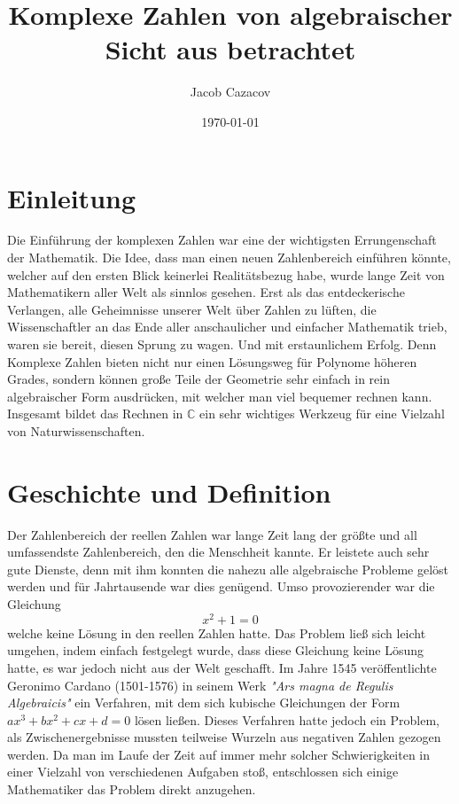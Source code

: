 \documentclass[a4paper,12pt]{article} %
\author{Jacob Cazacov}
\title{Komplexe Zahlen von algebraischer Sicht aus betrachtet}
\date{\today}
\begin{document}

\maketitle

\newpage

\tableofcontents

\newpage

\section{Einleitung}

Die Einführung der komplexen Zahlen war eine der wichtigsten Errungenschaft der Mathematik.
Die Idee, dass man einen neuen Zahlenbereich einführen könnte, welcher auf den ersten Blick keinerlei Realitätsbezug habe, wurde lange Zeit von Mathematikern aller Welt als sinnlos gesehen.
Erst als das entdeckerische Verlangen, alle Geheimnisse unserer Welt über Zahlen zu lüften, die Wissenschaftler an das Ende aller anschaulicher und einfacher Mathematik trieb, waren sie bereit, diesen Sprung zu wagen.
Und mit erstaunlichem Erfolg. Denn Komplexe Zahlen bieten nicht nur einen Lösungsweg für Polynome höheren Grades, sondern können große Teile der Geometrie sehr einfach in rein algebraischer Form ausdrücken, mit welcher man viel bequemer rechnen kann.
Insgesamt bildet das Rechnen in $\mathbb{C}$ ein sehr wichtiges Werkzeug für eine Vielzahl von Naturwissenschaften.

\section{Geschichte und Definition}

Der Zahlenbereich der reellen Zahlen war lange Zeit lang der größte und all umfassendste Zahlenbereich, den die Menschheit kannte.
Er leistete auch sehr gute Dienste, denn mit ihm konnten die nahezu alle algebraische Probleme gelöst werden und für Jahrtausende war dies genügend.
Umso provozierender war die Gleichung 
\[x^2+1=0\]
welche keine Lösung in den reellen Zahlen hatte.
Das Problem ließ sich leicht umgehen, indem einfach festgelegt wurde, dass diese Gleichung keine Lösung hatte, es war jedoch nicht aus der Welt geschafft.
Im Jahre 1545 veröffentlichte Geronimo Cardano (1501-1576) in seinem Werk \emph{"{Ars} magna de Regulis Algebraicis"} ein Verfahren, mit dem sich kubische Gleichungen der Form $ax^3+bx^2+cx+d=0$ lösen ließen.
Dieses Verfahren hatte jedoch ein Problem, als Zwischenergebnisse mussten teilweise Wurzeln aus negativen Zahlen gezogen werden.  
Da man im Laufe der Zeit auf immer mehr solcher Schwierigkeiten in einer Vielzahl von verschiedenen Aufgaben stoß, entschlossen sich einige Mathematiker das Problem direkt anzugehen.
\end{document}
